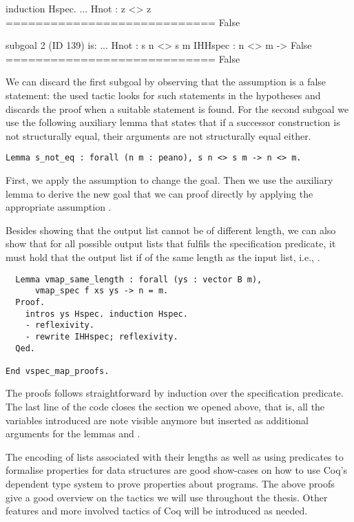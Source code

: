 \begin{cproof}{induction Hspec.}
  ...
  Hnot : z <> z
  ============================
  False

subgoal 2 (ID 139) is:
  ...
  Hnot : s n <> s m
  IHHspec : n <> m -> False
  ============================
  False
\end{cproof}

We can discard the first subgoal by observing that the assumption  is a false statement: the used tactic  looks for such statements in the hypotheses and discards the proof when a suitable statement is found.
For the second subgoal we use the following auxiliary lemma that states that if a successor construction is not structurally equal, their arguments are not structurally equal either.

\begin{verbatim}
Lemma s_not_eq : forall (n m : peano), s n <> s m -> n <> m.
\end{verbatim}

First, we apply the assumption  to change the goal.
Then we use the auxiliary lemma to derive the new goal  that we can proof directly by applying the appropriate assumption .

Besides showing that the output list cannot be of different length, we can also show that for all possible output lists  that fulfils the specification predicate, it must hold that the output list if of the same length as the input list, i.e., .

\begin{verbatim}
  Lemma vmap_same_length : forall (ys : vector B m),
      vmap_spec f xs ys -> n = m.
  Proof.
    intros ys Hspec. induction Hspec.
    - reflexivity.
    - rewrite IHHspec; reflexivity.
  Qed.

End vspec_map_proofs.
\end{verbatim}

The proofs follows straightforward by induction over the specification predicate.
The last line of the code closes the section we opened above, that is, all the variables introduced are note visible anymore but inserted as additional arguments for the lemmas  and .


The encoding of lists associated with their lengths as well as using predicates to formalise properties for data structures are good show-cases on how to use Coq's dependent type system to prove properties about programs.
The above proofs give a good overview on the tactics we will use throughout the thesis.
Other features and more involved tactics of Coq will be introduced as needed.

